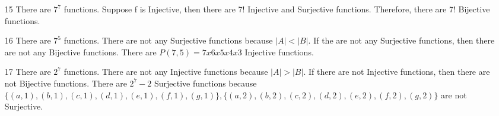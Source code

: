 \documentclass[12pt]{article}
\begin{document}
\begin{enumerate}
	\item [15] There are $7^7$ functions. Suppose f is Injective, then there are 7! Injective and Surjective functions. Therefore, there are 7! Bijective functions.
	\item [16] There are $7^5$ functions. There are not any Surjective functions because $|A| < |B|$. If the are not any Surjective functions, then there are not any Bijective functions. There are $P(7,5) = 7x6x5x4x3$ Injective functions.
	\item [17] There are $2^7$ functions. There are not any Injective functions because $|A| > |B|$. If there are not Injective functions, then there are not Bijective functions. There are $2^7 - 2$ Surjective functions because $\{(a,1), (b,1), (c,1), (d,1), (e,1), (f,1), (g,1)\}, \{(a,2), (b,2), (c,2), (d,2), (e,2), (f,2), (g,2)\}$ are not Surjective.
\end{enumerate}
\end{document}
